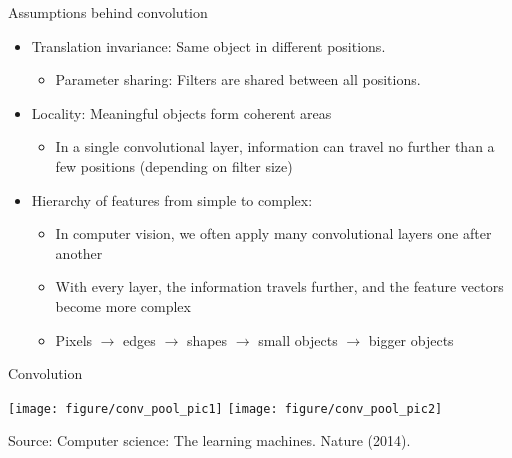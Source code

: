 \begin{vbframe}{Assumptions behind convolution}

\vfill

\begin{itemize}
	\item Translation invariance: Same object in different positions.
		\begin{itemize}
			\item Parameter sharing: Filters are shared between all positions.
		\end{itemize}
	\item Locality: Meaningful objects form coherent areas
		\begin{itemize}
			\item In a single convolutional layer, information can travel no further than a few positions (depending on filter size)
		\end{itemize}
	\item Hierarchy of features from simple to complex:
		\begin{itemize}
			\item In computer vision, we often apply many convolutional layers one after another
			\item With every layer, the information travels further, and the feature vectors become more complex
			\item Pixels $\rightarrow$ edges $\rightarrow$ shapes $\rightarrow$ small objects $\rightarrow$ bigger objects
		\end{itemize}
\end{itemize}

\vfill

\end{vbframe}


\begin{vbframe}{Convolution}

\vfill

\begin{center}
\texttt{[image: figure/conv\_pool\_pic1]}
\texttt{[image: figure/conv\_pool\_pic2]}
\end{center}

\footnotesize{Source: Computer science: The learning machines. Nature (2014).}

\vfill

\end{vbframe}

